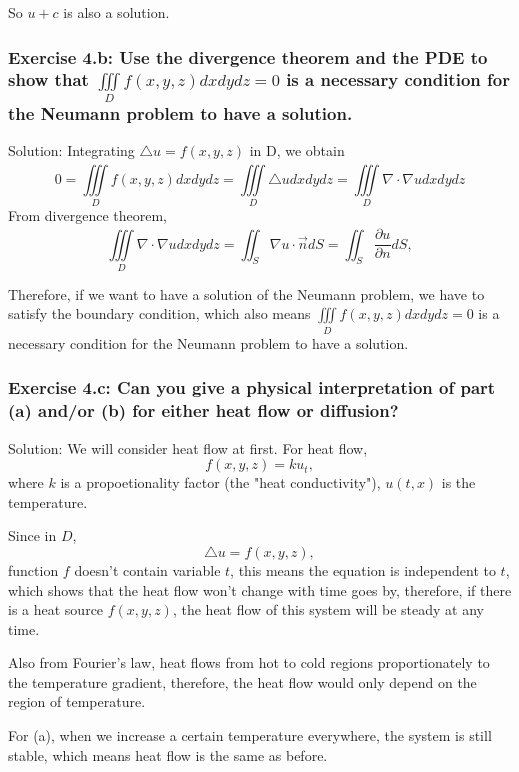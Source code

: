 \documentclass{article}
\begin{document}


		So $u+c$ is also a solution.

		\subsubsection{Exercise 4.b: Use the divergence theorem and the PDE to show that $ \iiint\limits_{D}^{} f(x,y,z)dxdydz=0$ is a necessary condition for the Neumann problem to have a solution.}
		
		Solution: Integrating $\triangle u = f(x,y,z)$ in D, we obtain
		\[0= \iiint\limits_{D}^{} f(x,y,z)dxdydz=\iiint\limits_{D}^{} \triangle u dxdydz=\iiint\limits_{D}^{} \nabla \cdot \nabla u dxdydz
		\]
		From divergence theorem,
		\[\iiint\limits_{D}^{} \nabla \cdot \nabla u dxdydz=\iint_{S}^{} \nabla u \cdot \vec{n}dS=\iint_{S}^{} \frac{\partial u}{\partial n}dS,
			\]

			Therefore, if we want to have a solution of the Neumann problem, we have to satisfy the boundary condition, which also means $ \iiint\limits_{D}^{} f(x,y,z)dxdydz=0$ is a necessary condition for the Neumann problem to have a solution.
			\subsubsection{ Exercise 4.c: Can you give a physical interpretation of part (a) and/or (b) for either heat flow or diffusion?}
		
		Solution: We will consider heat flow at first. For heat flow, \[f(x,y,z)=ku_{t},\]
		where $k$ is a propoetionality factor (the "heat conductivity"), $u(t,x)$ is the temperature.
        
		Since in $D$, \[\triangle u = f(x,y,z),\] function $f$ doesn't contain variable $t$, this means the equation is independent to $t$, which shows that the heat flow won't change with time goes by, therefore, if there is a heat source $f(x,y,z)$, the heat flow of this system will be steady at any time. 
		
		Also from Fourier's law, heat flows from hot to cold regions proportionately to the temperature gradient, therefore, the heat flow would only depend on the region of temperature.
         
		For (a), when we increase a certain temperature everywhere, the system is still stable, which means heat flow is the same as before. 
\end{document}
